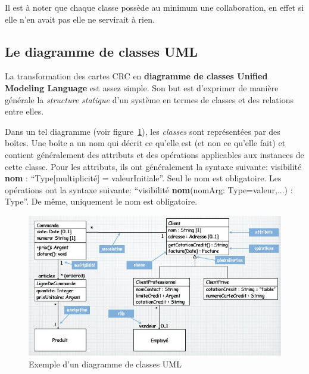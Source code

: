 Il est à noter que chaque classe possède au minimum une collaboration,
en effet si elle n'en avait pas elle ne servirait à rien.

\subsection{Le diagramme de classes UML}
La transformation des cartes CRC en
\textbf{diagramme de classes Unified Modeling Language} est assez simple.
Son but est d'exprimer de manière générale la \emph{structure statique}
d'un système en termes de classes et des relations entre elles.

Dans un tel diagramme (voir figure~\ref{diagramme_classes}),
les \emph{classes} sont représentées par des boîtes.
Une boîte a un nom qui décrit ce qu'elle est (et non ce qu'elle fait)
et contient généralement des attributs et des opérations applicables
aux instances de cette classe.
Pour les attributs,
ils ont généralement la syntaxe suivante:
visibilité \textbf{nom} : ``Type[multiplicité] = valeurInitiale''.
Seul le nom est obligatoire.
Les opérations ont la syntaxe suivante:
``visibilité \textbf{nom}(nomArg: Type=valeur,...) : Type''.
De même, uniquement le nom est obligatoire.

\begin{figure}[h]
  \centering
  \includegraphics[scale=0.8]{diagramme_classes.jpg}
  \caption{Exemple d'un diagramme de classes UML}
  \label{diagramme_classes}
\end{figure}

